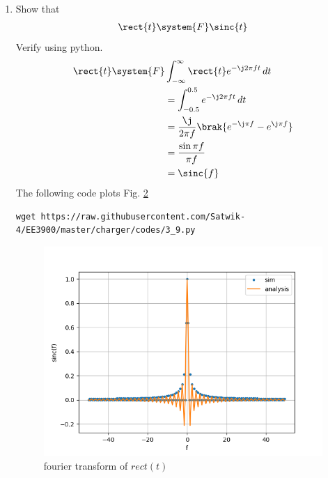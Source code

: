 \documentclass[journal,12pt,twocolumn]{IEEEtran}
\renewcommand\thesection{\arabic{section}}
\begin{document}
\begin{enumerate}[label=\thesection.\arabic*
,ref=\thesection.\theenumi]
\begin{figure}[h!]
	    \caption{fourier transform of $x(t)$ }
	    \label{fig:xt-ft}
	\end{figure}
 \item Show that 
 \begin{align}
	 \rect{t} \system{F} \sinc{t}
 \end{align}
 Verify using python.\\\solution
 \begin{align}
     \rect{t} \system{F}&\int_{-\infty}^\infty \rect{t}e^{-\j2\pi ft}\,dt\\
     &= \int_{-0.5}^{0.5}e^{-\j2\pi ft}\,dt\\
     &= \frac{\j}{2\pi f}\brak{e^{-\j\pi f}-e^{\j\pi f}}\\
     &= \frac{\sin{\pi f}}{\pi f}\\
     &= \sinc{f}
 \end{align}
  The following code plots Fig. \ref{fig:rect-ft}
	\begin{lstlisting}
wget https://raw.githubusercontent.com/Satwik-4/EE3900/master/charger/codes/3_9.py
\end{lstlisting}
	\begin{figure}[h!]
	    \centering
	    \includegraphics[width=\columnwidth]{figures/rect-ft.png}
	    \caption{fourier transform of $rect(t)$ }
	    \label{fig:rect-ft}
	\end{figure}


\end{enumerate}
\end{document}
